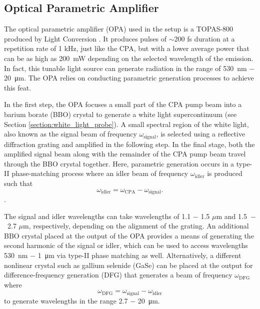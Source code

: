\subsection{Optical Parametric Amplifier}
\label{section:opa}

The optical parametric amplifier (OPA) used in the setup is a TOPAS-800 produced by Light Conversion \cite{topas}. It produces pulses of $\sim$200 fs duration at a repetition rate of 1 kHz, just like the CPA, but with a lower average power that can be as high as \SI{200}{\milli\watt} depending on the selected wavelength of the emission. In fact, this tunable light source can generate radiation in the range of \SI{530}{\nano\meter} $-$ \SI{20}{\micro\meter}. The OPA relies on conducting parametric generation processes to achieve this feat.

In the first step, the OPA focuses a small part of the CPA pump beam into a barium borate (BBO) crystal to generate a white light supercontinuum (see Section \ref{section:white_light_probe}). A small spectral region of the white light, also known as the signal beam of frequency $\omega_\text{signal}$, is selected using a reflective diffraction grating and amplified in the following step. In the final stage, both the amplified signal beam along with the remainder of the CPA pump beam travel through the BBO crystal together. Here, parametric generation occurs in a type-II phase-matching process where an idler beam of frequency $\omega_\text{idler}$ is produced such that
\begin{equation}
	\omega_\text{idler} = \omega_\text{CPA} - \omega_\text{signal}.
\end{equation}
\cite{dunn1999parametric, boyd2003nonlinear}.

The signal and idler wavelengths can take wavelengths of 1.1 $-$ 1.5 $\mu$m  and 1.5~$-$~2.7 $\mu$m, respectively, depending on the alignment of the grating. An additional BBO crystal placed at the output of the OPA provides a means of generating the second harmonic of the signal or idler, which can be used to access wavelengths \SI{530}{nm} $-$ \SI{1}{\micro \meter} via type-II phase matching as well. Alternatively, a different nonlinear crystal such as gallium selenide (GaSe) can be placed at the output for difference-frequency generation (DFG) that generates a beam of frequency $\omega_\text{DFG}$ where
\begin{equation}
	\omega_\text{DFG} = \omega_\text{signal} - \omega_\text{idler}
\end{equation}
to generate wavelengths in the range 2.7 $-$ \SI{20}{\micro\meter}.
